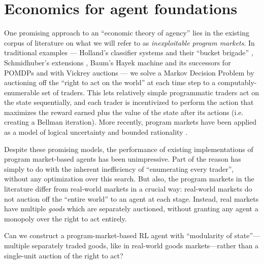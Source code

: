 \section{Economics for agent foundations}\label{intro:sec:agency}

One promising approach to an ``economic theory of agency'' lies in the existing corpus of literature on what we will refer to as \emph{inexploitable program markets}. In traditional examples --- Holland's classifier systems and their ``bucket brigade'' \citep{hollandPropertiesBucketBrigade1985a}, Schmidhuber's extensions \citep{schmidhuberEvolutionaryPrinciplesSelfreferential1987, schmidhuberLocalLearningAlgorithm1989}, Baum's Hayek machine \citep{baumModelIntelligenceEconomy1999} and its successors for POMDPs \citep{kweeMarketBasedReinforcementLearning2001} and with Vickrey auctions \citep{changDecentralizedReinforcementLearning2020} --- we solve a Markov Decision Problem by auctioning off the ``right to act on the world'' at each time step to a computably-enumerable set of traders. This lets relatively simple programmatic traders act on the state sequentially, and each trader is incentivized to perform the action that maximizes the reward earned plus the value of the state after its actions (i.e. creating a Bellman iteration). More recently, program markets have been applied as a model of logical uncertainty \citep{garrabrantLogicalInduction2016} and bounded rationality \citep{oesterheldTheoryBoundedInductive2023}.

Despite these promising models, the performance of existing implementations of program market-based agents has been unimpressive. Part of the reason has simply to do with the inherent inefficiency of ``enumerating every trader'', without any optimization over this search. But also, the program markets in the literature differ from real-world markets in a crucial way: real-world markets do not auction off the ``entire world'' to an agent at each stage. Instead, real markets have multiple \emph{goods} which are separately auctioned, without granting any agent a monopoly over the right to act entirely.

\begin{researchquestion}\label{rq:goods}
Can we construct a program-market-based RL agent with ``modularity of state''---multiple separately traded goods, like in real-world goods markets---rather than a single-unit auction of the right to act?
\end{researchquestion}

